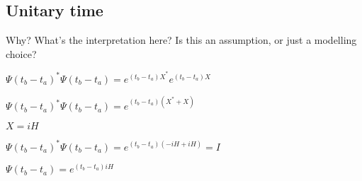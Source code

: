 
\subsection{Unitary time}

Why? What's the interpretation here? Is this an assumption, or just a modelling choice?

\(\Psi (t_b-t_a)^* \Psi (t_b-t_a)=e^{(t_b-t_a)X}^* e^{(t_b-t_a)X}\)

\(\Psi (t_b-t_a)^* \Psi (t_b-t_a)=e^{(t_b-t_a)(X^*+X)}\)

\(X=iH\)

\(\Psi (t_b-t_a)^* \Psi (t_b-t_a)=e^{(t_b-t_a)(-iH+iH)}=I\)

\(\Psi (t_b-t_a)=e^{(t_b-t_a)iH}\)

